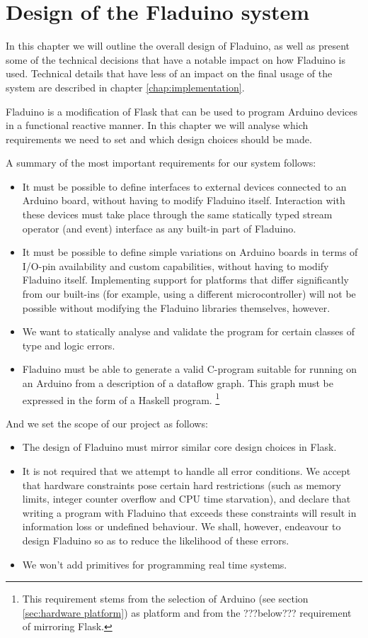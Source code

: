 \documentclass[a4paper, oneside, final]{memoir}
\begin{document}
\chapter{Design of the Fladuino system}
\label{chap:design}

In this chapter we will outline the overall design of Fladuino, as
well as present some of the technical decisions that have a notable
impact on how Fladuino is used.  Technical details that have less of
an impact on the final usage of the system are described in chapter
\ref{chap:implementation}.

Fladuino is a modification of Flask that can be used to program
Arduino devices in a functional reactive manner. In this chapter we
will analyse which requirements we need to set and which design
choices should be made.

A summary of the most important requirements for our system follows:

\begin{itemize}
\item It must be possible to define interfaces to external devices
  connected to an Arduino board, without having to modify Fladuino
  itself.  Interaction with these devices must take place through the
  same statically typed stream operator (and event) interface as any
  built-in part of Fladuino.
\item It must be possible to define simple variations on Arduino
  boards in terms of I/O-pin availability and custom capabilities,
  without having to modify Fladuino itself.  Implementing support for
  platforms that differ significantly from our built-ins (for example,
  using a different microcontroller) will not be possible without
  modifying the Fladuino libraries themselves, however.
\item We want to statically analyse and validate the program for
  certain classes of type and logic errors.
\item Fladuino must be able to generate a valid C-program suitable for
  running on an Arduino from a description of a dataflow graph. This
  graph must be expressed in the form of a Haskell program.
  \footnote{This requirement stems from the selection of
    Arduino (see section \ref{sec:hardware platform}) as platform and from the
    ???below??? requirement of mirroring Flask.}
\end{itemize}

And we set the scope of our project as follows:
\begin{itemize}
\item The design of Fladuino must mirror similar core design choices
  in Flask.
\item It is not required that we attempt to handle all error
  conditions.  We accept that hardware constraints pose certain hard
  restrictions (such as memory limits, integer counter overflow and
  CPU time starvation), and declare that writing a program with
  Fladuino that exceeds these constraints will result in information
  loss or undefined behaviour.  We shall, however, endeavour to design
  Fladuino so as to reduce the likelihood of these errors.
\item We won't add primitives for programming real time systems.
\end{itemize}
\end{document}
